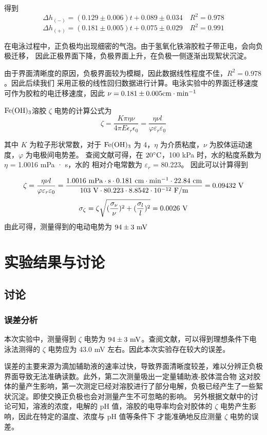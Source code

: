 \documentclass[cn,hazy,pku,12pt,normal,math=newtx,cite=super]{elegantnote}
\begin{document}
得到
$$
\Delta h_{(-)} =(0.129 \pm 0.006) t + 0.089 \pm 0.034 \quad R^2=0.978 
$$
$$
\Delta h_{(+)} =(0.181 \pm 0.005) t + 0.075 \pm 0.029 \quad R^2=0.991 
$$

在电泳过程中，正负极均出现细密的气泡。由于氢氧化铁溶胶粒子带正电，会向负极迁移，
因此正极界面下降，负极界面上升，在负极一侧逐渐出现絮状沉淀。

由于界面清晰度的原因，负极界面较为模糊，因此数据线性程度不佳，$R^2=0.978$。因此后续我们
采用正极的线性回归数据进行计算。电泳实验中的界面迁移速度可作为胶粒的电迁移速度，因此 $\nu = 0.181 \pm 0.005 {\rm cm \cdot min^{-1}}$

$\rm Fe(OH)_3$溶胶 $\zeta$ 电势的计算公式为
$$
    \zeta = \frac{K\pi\eta\nu}{4\pi E \epsilon_r \epsilon_0} =  \frac{\eta\nu l}{\varphi \varepsilon_r \varepsilon_0}  
$$

其中 $K$ 为粒子形状常数，对于 $\rm Fe(OH)_3$ 为 4，$\eta$ 为介质粘度，$\nu$ 为胶体运动速度，$\varphi$ 为电极间电势差。
查阅文献可得\cite{Weast1988CRC}，在 $\rm 20 \degree C$，100 kPa 时，水的粘度系数为 $\eta$ = 1.0016 mPa · s，水的
相对介电常数为 $\varepsilon_r$  = 80.223。
因此可以计算得到

$$
    \zeta = \frac{\eta\nu l}{\varphi \varepsilon_r \varepsilon_0} = {\rm \frac{1.0016\ mPa \cdot s \cdot 0.181\ cm \cdot min^{-1} \cdot 22.84\ cm}{103\ V \cdot 80.223 \cdot 8.8542 \cdot 10^{-12}\ F/m} = 0.09432\ V}
$$
$$
    \sigma_\zeta = \zeta \sqrt{(\frac{\sigma_\nu}{\nu})^2+(\frac{\sigma_l}{ l})^2} = 0.0026\ \rm V
$$
由此可得，测量得到的电动电势为 $94 \pm 3\ \rm mV$

\section{实验结果与讨论}
\subsection{讨论}
\subsubsection{误差分析}

本次实验中，测量得到 $\zeta$ 电势为 $94 \pm 3\ \rm mV$。查阅文献\cite{dianyong}，可以得到理想条件下电泳法测得的 $\zeta$ 电势应为
43.0 mV 左右。因此本次实验存在较大的误差。

误差的主要来源为滴加辅助液的速率过快，导致界面清晰度较差，难以分辨正负极界面导致无法准确读数。此外，第二次测量吸出一定量辅助液-胶体混合物
这对胶体的量产生影响，第一次测定已经对溶胶进行了部分电解，负极已经产生了一些絮状沉淀。即使交换正负极也会对测量产生不可忽略的影响。
另外根据文献中的讨论可知\cite{dianyong}，溶液的浓度，电解的 pH 值，溶胶的电导率均会对胶体的 $\zeta$ 电势产生影响，因此在特定的温度、浓度与 pH 值等条件下
才能准确地反应测量 $\zeta$ 电势的误差。
\end{document}
